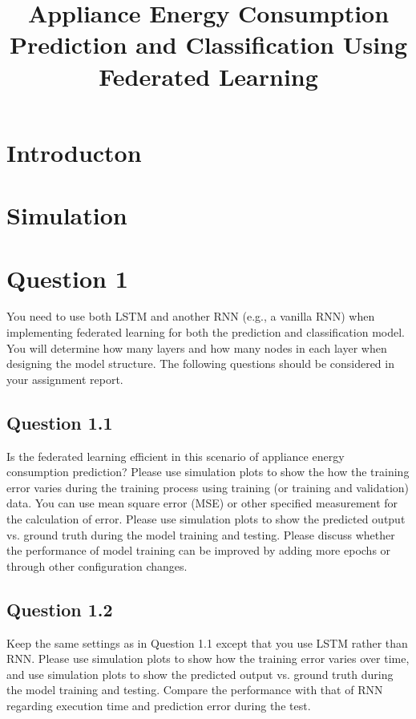\documentclass[a4paper, article, oneside, USenglish, IN5460]{memoir}
\title{Appliance Energy Consumption Prediction and Classification Using Federated Learning}
\date{}
\begin{document}
\projectfrontpage



\chapter{Introducton}


\chapter{Simulation}



\chapter{Question 1}

You need to use both LSTM and another RNN (e.g., a vanilla RNN) when implementing federated learning for both the prediction and classification model. You will determine how many layers and how many nodes in each layer when designing the model structure. The following questions should be considered in your assignment report.

\section{Question 1.1}

Is the federated learning efficient in this scenario of appliance energy consumption prediction? Please use simulation plots to show the how the training error varies during the training process using training (or training and validation) data. You can use mean square error (MSE) or other specified measurement for the calculation of error. Please use simulation plots to show the predicted output vs. ground truth during the model training and testing. Please discuss whether the performance of model training can be improved by adding more epochs or through other configuration changes.


\section{Question 1.2}

Keep the same settings as in Question 1.1 except that you use LSTM rather than RNN. Please use simulation plots to show how the training error varies over time, and use simulation plots to show the predicted output vs. ground truth during the model training and testing. Compare the performance with that of RNN regarding execution time and prediction error during the test.
\end{document}
